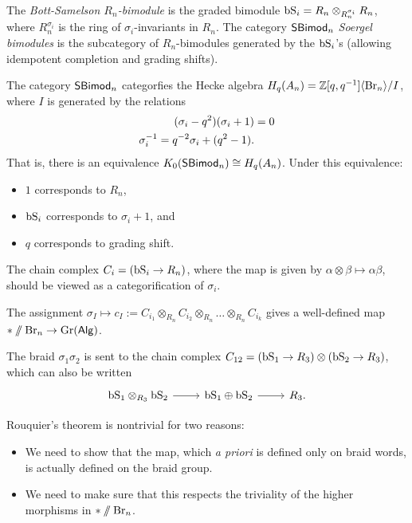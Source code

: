 \begin{dfn}
	The \emph{Bott-Samelson $R_n$-bimodule} is the graded bimodule $\mathrm{bS}_i = R_n \otimes_{R_n^{\sigma_i}} R_n$, where $R_n^{\sigma_i}$ is the ring of $\sigma_i$-invariants in $R_n$.
	The category $\mathsf{SBimod}_n$ \emph{Soergel bimodules} is the subcategory of $R_n$-bimodules generated by the $\mathrm{bS}_i$'s (allowing idempotent completion and grading shifts).
\end{dfn}

\begin{thm}[Soergel]
	The category $\mathsf{SBimod}_n$ categorfies the Hecke algebra $H_q(A_n) = \mathbb{Z}[q, q^{-1}]\langle \mathrm{Br}_n \rangle / I$, where $I$ is generated by the relations
	\begin{align*}
		(\sigma_i - q^2)(\sigma_i + 1) &= 0 \\
		\sigma_i^{-1} = q^{-2} \sigma_i + (q^2- 1).
	\end{align*}
	That is, there is an equivalence $K_0(\mathsf{SBimod}_n) \cong H_q(A_n)$.
	Under this equivalence:
	\begin{itemize}
		\item $1$ corresponds to $R_n$,
		\item $\mathrm{bS}_i$ corresponds to $\sigma_i + 1$, and
		\item $q$ corresponds to grading shift.
	\end{itemize}
\end{thm}

The chain complex $C_i = (\mathrm{bS}_i \to R_n)$, where the map is given by $\alpha \otimes \beta \mapsto \alpha \beta$, should be viewed as a categorification of $\sigma_i$.

\begin{thm}[Rouquier]
	The assignment $\sigma_I \mapsto c_I := C_{i_1} \otimes_{R_n} C_{i_2} \otimes_{R_n} \dots \otimes_{R_n} C_{i_k}$ gives a well-defined map $* \mathbin{/\mkern-6mu/} \mathrm{Br}_n \to \operatorname{Gr}(\mathsf{Alg})$.
\end{thm}

\begin{ex}
	The braid $\sigma_1 \sigma_2$ is sent to the chain complex $C_{12} = (\mathrm{bS}_1 \to R_3) \otimes (\mathrm{bS}_2 \to R_3)$, which can also be written
	\[
		\begin{tikzcd}
			\bS_1 \otimes_{R_3} \bS_2 \rar & \bS_1 \oplus \bS_2 \rar & R_3.
		\end{tikzcd}
	\]
\end{ex}

Rouquier's theorem is nontrivial for two reasons:
\begin{itemize}
	\item We need to show that the map, which \emph{a priori} is defined only on braid words, is actually defined on the braid group.
	\item We need to make sure that this respects the triviality of the higher morphisms in $* \mathbin{/\mkern-6mu/} \mathrm{Br}_n$.
\end{itemize}

